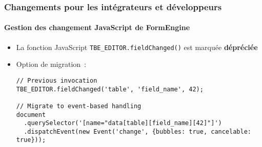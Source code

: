 %

\begin{frame}[fragile]
	\frametitle{Changements pour les intégrateurs et développeurs}
	\framesubtitle{Gestion des changement JavaScript de FormEngine}


	\begin{itemize}
		\item La fonction JavaScript \texttt{TBE\_EDITOR.fieldChanged()} est
			marquée \textbf{dépréciée}
		\item Option de migration~:
			\vspace{0.2cm}
\begin{lstlisting}
// Previous invocation
TBE_EDITOR.fieldChanged('table', 'field_name', 42);

// Migrate to event-based handling
document
  .querySelector('[name="data[table][field_name][42]"]')
  .dispatchEvent(new Event('change', {bubbles: true, cancelable: true}));
\end{lstlisting}

	\end{itemize}
\end{frame}

